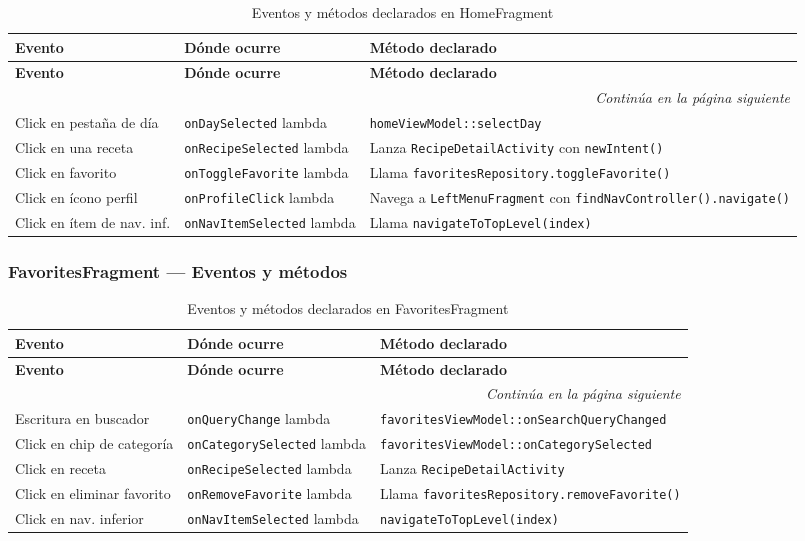 \documentclass[stu, 12pt, letterpaper, donotrepeattitle, floatsintext, natbib]{apa7}
\begin{document}
\begin{longtable}{@{}p{2.5cm}p{4cm}p{9cm}@{}}
\caption{Eventos y métodos declarados en HomeFragment}
\label{tab:evhome}\\
\toprule
\textbf{Evento} & \textbf{Dónde ocurre} & \textbf{Método declarado} \\
\midrule
\endfirsthead
\toprule
\textbf{Evento} & \textbf{Dónde ocurre} & \textbf{Método declarado} \\
\midrule
\endhead
\midrule
\multicolumn{3}{r}{\small\textit{Continúa en la página siguiente}}\\
\endfoot
\bottomrule
\endlastfoot
Click en pestaña de día & \texttt{onDaySelected} lambda & \texttt{homeViewModel::selectDay} \\[3pt]
Click en una receta & \texttt{onRecipeSelected} lambda & Lanza \texttt{RecipeDetailActivity} con \texttt{newIntent()} \\[3pt]
Click en favorito & \texttt{onToggleFavorite} lambda & Llama \texttt{favoritesRepository.toggleFavorite()} \\[3pt]
Click en ícono perfil & \texttt{onProfileClick} lambda & Navega a \texttt{LeftMenuFragment} con \texttt{findNavController().navigate()} \\[3pt]
Click en ítem de nav. inf. & \texttt{onNavItemSelected} lambda & Llama \texttt{navigateToTopLevel(index)} \\
\end{longtable}

\subsubsection{FavoritesFragment --- Eventos y métodos}

\begin{longtable}{@{}p{2.5cm}p{4cm}p{9cm}@{}}
\caption{Eventos y métodos declarados en FavoritesFragment}
\label{tab:evfavorites}\\
\toprule
\textbf{Evento} & \textbf{Dónde ocurre} & \textbf{Método declarado} \\
\midrule
\endfirsthead
\toprule
\textbf{Evento} & \textbf{Dónde ocurre} & \textbf{Método declarado} \\
\midrule
\endhead
\midrule
\multicolumn{3}{r}{\small\textit{Continúa en la página siguiente}}\\
\endfoot
\bottomrule
\endlastfoot
Escritura en buscador & \texttt{onQueryChange} lambda & \texttt{favoritesViewModel::onSearchQueryChanged} \\[3pt]
Click en chip de categoría & \texttt{onCategorySelected} lambda & \texttt{favoritesViewModel::onCategorySelected} \\[3pt]
Click en receta & \texttt{onRecipeSelected} lambda & Lanza \texttt{RecipeDetailActivity} \\[3pt]
Click en eliminar favorito & \texttt{onRemoveFavorite} lambda & Llama \texttt{favoritesRepository.removeFavorite()} \\[3pt]
Click en nav. inferior & \texttt{onNavItemSelected} lambda & \texttt{navigateToTopLevel(index)} \\
\end{longtable}
\end{document}
